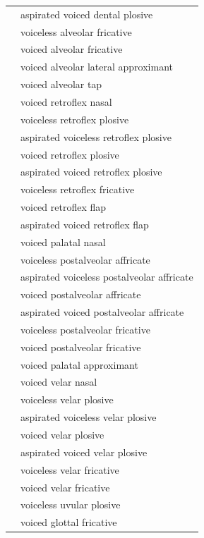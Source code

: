 \documentclass[12pt]{article}
\begin{document}
\begin{xltabular}{\textwidth}{lL}
   & aspirated voiced dental plosive \\
   & voiceless alveolar fricative \\
   & voiced alveolar fricative \\
   & voiced alveolar lateral approximant \\
   & voiced alveolar tap \\
   & voiced retroflex nasal \\
   & voiceless retroflex plosive \\
   & aspirated voiceless retroflex plosive \\
   & voiced retroflex plosive \\
   & aspirated voiced retroflex plosive \\
   & voiceless retroflex fricative \\
   & voiced retroflex flap \\
   & aspirated voiced retroflex flap \\
  \ipa{\textltailn} & voiced palatal nasal \\
  \ipa{\t{\textteshlig}} & voiceless postalveolar affricate \\
   & aspirated voiceless postalveolar affricate \\
  \ipa{\t{\textdyoghlig}} & voiced postalveolar affricate \\
   & aspirated voiced postalveolar affricate \\
   & voiceless postalveolar fricative \\
   & voiced postalveolar fricative \\
   & voiced palatal approximant \\
   & voiced velar nasal \\
   & voiceless velar plosive \\
   & aspirated voiceless velar plosive \\
   & voiced velar plosive \\
   & aspirated voiced velar plosive \\
   & voiceless velar fricative \\
   & voiced velar fricative \\
   & voiceless uvular plosive \\
  \ipa{\texthth} & voiced glottal fricative \\
\end{xltabular}
\end{document}
